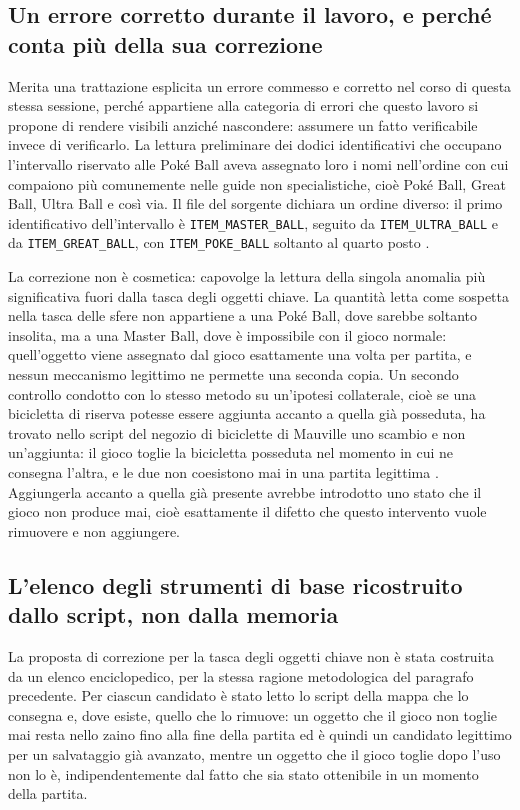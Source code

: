 \subsection{Un errore corretto durante il lavoro, e perché conta più della sua correzione}

Merita una trattazione esplicita un errore commesso e corretto nel corso di questa stessa sessione, perché appartiene alla categoria di errori che questo lavoro si propone di rendere visibili anziché nascondere: assumere un fatto verificabile invece di verificarlo. La lettura preliminare dei dodici identificativi che occupano l'intervallo riservato alle Poké Ball aveva assegnato loro i nomi nell'ordine con cui compaiono più comunemente nelle guide non specialistiche, cioè Poké Ball, Great Ball, Ultra Ball e così via. Il file  del sorgente dichiara un ordine diverso: il primo identificativo dell'intervallo è \texttt{ITEM\_MASTER\_BALL}, seguito da \texttt{ITEM\_ULTRA\_BALL} e da \texttt{ITEM\_GREAT\_BALL}, con \texttt{ITEM\_POKE\_BALL} soltanto al quarto posto \cite{pokeemerald}.

La correzione non è cosmetica: capovolge la lettura della singola anomalia più significativa fuori dalla tasca degli oggetti chiave. La quantità letta come sospetta nella tasca delle sfere non appartiene a una Poké Ball, dove sarebbe soltanto insolita, ma a una Master Ball, dove è impossibile con il gioco normale: quell'oggetto viene assegnato dal gioco esattamente una volta per partita, e nessun meccanismo legittimo ne permette una seconda copia. Un secondo controllo condotto con lo stesso metodo su un'ipotesi collaterale, cioè se una bicicletta di riserva potesse essere aggiunta accanto a quella già posseduta, ha trovato nello script del negozio di biciclette di Mauville uno scambio e non un'aggiunta: il gioco toglie la bicicletta posseduta nel momento in cui ne consegna l'altra, e le due non coesistono mai in una partita legittima \cite{pokeemerald}. Aggiungerla accanto a quella già presente avrebbe introdotto uno stato che il gioco non produce mai, cioè esattamente il difetto che questo intervento vuole rimuovere e non aggiungere.

\subsection{L'elenco degli strumenti di base ricostruito dallo script, non dalla memoria}

La proposta di correzione per la tasca degli oggetti chiave non è stata costruita da un elenco enciclopedico, per la stessa ragione metodologica del paragrafo precedente. Per ciascun candidato è stato letto lo script della mappa che lo consegna e, dove esiste, quello che lo rimuove: un oggetto che il gioco non toglie mai resta nello zaino fino alla fine della partita ed è quindi un candidato legittimo per un salvataggio già avanzato, mentre un oggetto che il gioco toglie dopo l'uso non lo è, indipendentemente dal fatto che sia stato ottenibile in un momento della partita.

